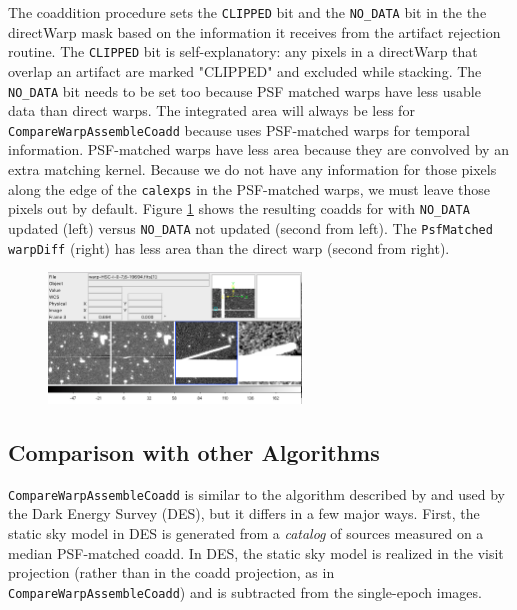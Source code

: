 \documentclass[DM,authoryear,toc]{lsstdoc}
\begin{document}
The coaddition procedure sets the \texttt{CLIPPED} bit and the  \texttt{NO\_DATA} bit in the the directWarp mask  based on the information it receives from the artifact rejection routine.
The  \texttt{CLIPPED} bit is self-explanatory: any pixels in a directWarp that overlap an artifact are marked "CLIPPED" and excluded while stacking.
The  \texttt{NO\_DATA} bit needs to be set too because PSF matched warps  have less usable data than direct warps.
The integrated area will always be less for  \texttt{CompareWarpAssembleCoadd} because uses PSF-matched warps for temporal information.
PSF-matched warps have less area because they are convolved by an extra matching kernel.
Because we do not have any information for those pixels along the edge of the \texttt{calexps} in the PSF-matched warps, we must leave those pixels out by default.
Figure \ref{fig:nodata} shows the resulting coadds for with \texttt{NO\_DATA} updated (left) versus \texttt{NO\_DATA} not updated (second from left).
The \texttt{PsfMatched} \texttt{warpDiff} (right)  has less area than the direct warp (second from right).

\begin{figure}
\begin{centering}
\includegraphics[width=0.6\textwidth]{figures/less_data.png}
\par\end{centering}
\caption{\label{fig:nodata} }
\end{figure}

\subsection{Comparison with other Algorithms}

\texttt{CompareWarpAssembleCoadd} is  similar to the algorithm described by \citet{Desai2016} and used by the Dark Energy Survey (DES), but it differs in a few major ways.
First, the static sky model in DES  is generated from a \emph{catalog} of sources measured on a median PSF-matched coadd.
In DES, the static sky model is realized in the visit projection (rather than in the coadd projection, as in \texttt{CompareWarpAssembleCoadd}) and is subtracted from the single-epoch images.
\end{document}
